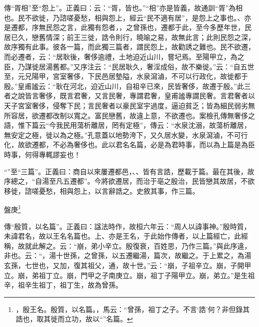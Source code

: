 {\noindent\zhuan{}\fzbyks 傳“胥相”至“怨上”。正義曰：云：“胥，皆也。”“相”亦是皆義，故通訓“胥”為相也。民不欲徙，乃諮嗟憂愁，相與怨上，經云“民不適有居”，是怨上之事也。、亦是遷都，序無民怨之言，此獨有怨者，，之曾孫也，遷都于此，至今多歷年世，民居已久，戀舊情深；前王三徙，誥令則行，曉喻之易，故無此言；此則民怨之深，故序獨有此事。彼各一篇，而此獨三篇者，謂民怨上，故勸誘之難也。民不欲遷，而必遷者，云：“居耿後，奢侈逾禮，土地迫近山川，嘗圮焉。至陽甲立，為之臣，乃謀徙居湯舊都。”又序注云：“民居耿久，奢淫成俗，故不樂徙。”云：“自五世至，元兄陽甲，宮室奢侈，下民邑居墊隘，水泉瀉滷，不可以行政化，故徙都于殷。”皇甫謐云：“耿在河北，迫近山川，自祖辛已來，民皆奢侈，故遷于殷。”此三者之說皆言奢侈，既言君奢，又言民奢，專謂君奢，皇甫謐專謂民奢。言君奢者以天子宮室奢侈，侵奪下民；言民奢者以豪民室宇過度，逼迫貧乏；皆為細民弱劣無所容居，欲遷都改制以寬之。富民戀舊，故違上意，不欲遷也。案檢孔傳無奢侈之語，惟下篇云“今我民用蕩析離居，罔有定極”，傳云：“水泉沈溺，故蕩析離居，無安定之極，徙以為之極。”孔意蓋以地勢洿下，又久居水變，水泉瀉滷，不可行化，故欲遷都，不必為奢侈也。此以君名名篇，必是為君時事，而以為上篇是為臣時事，何得專輒謬妄也！ \par}

{\noindent\shu{}\fzkt “”至“三篇”。正義曰：商自以來屢遷都邑，、、皆有言誥，歷載于篇。最在其後，故序總之，“自湯至凡五遷都”。今將欲遷居，而治于亳之殷治，民皆戀其故居，不欲移徙，諮嗟憂愁，相與怨上，以言辭誥之。史敘其事，作三篇。 \par}

盤庚\footnote{，殷王名。殷質，以名篇。，馬云：“曾孫，祖丁之子。不言‘誥’何？非但錄其誥也，取其徙而立功，故以“”名篇。}


{\noindent\zhuan{}\fzbyks 傳“殷質，以名篇”。正義曰：諡法時作，故桓六年云：“周人以諱事神。”殷時質，未諱君名，故以王名名篇也。上、亦是王名，于此始作傳者，以上篇經亡，此經稱，故就此解之。云：“崩，弟小辛立。殷復衰，百姓思，乃作三篇。”與此序違，非也。云：“，湯十世孫，之曾孫，以五遷繼湯，篇次，故繼之。于上累之，為湯玄孫，七世也，又加，復其祖父，通，故十世。”云：“崩，子祖辛立。崩，子開甲立。崩，弟祖丁立。崩，門甲之子南庚立。崩，祖丁子陽甲立。崩，弟立。”是生祖辛，祖辛生祖丁，祖丁生，故為曾孫。 \par}

